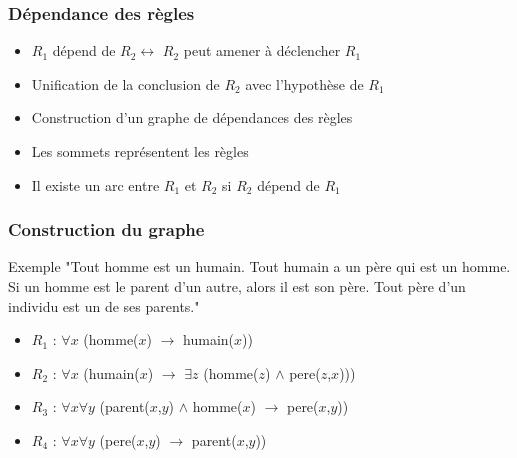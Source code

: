 
\begin{frame}
	\frametitle{Dépendance des règles}
	\begin{itemize}
		\item $R_1$ dépend de $R_2 \leftrightarrow $ $R_2$ peut amener à déclencher $R_1$
		\item Unification de la conclusion de $R_2$ avec l'hypothèse de $R_1$
		\item Construction d'un graphe de dépendances des règles
		\item Les sommets représentent les règles
		\item Il existe un arc entre $R_1$ et $R_2$ si $R_2$ dépend de $R_1$
	\end{itemize}
\end{frame}

\begin{frame}
	\frametitle{Construction du graphe}
	\begin{exampleblock}{Exemple}
		"Tout homme est un humain.
		Tout humain a un père qui est un homme.
		Si un homme est le parent d'un autre, alors il est son père.
		Tout père d'un individu est un de ses parents."

		\begin{itemize}
			\item $R_1$ : $\forall x$ (homme($x$) $\rightarrow$ humain($x$))
			\item $R_2$ : $\forall x$ (humain($x$) $\rightarrow$ $\exists z$ (homme($z$)
			$\wedge$ pere($z$,$x$)))
			\item $R_3$ : $\forall x \forall y$ (parent($x$,$y$) $\wedge$ homme($x$)
			$\rightarrow$ pere($x$,$y$))
			\item $R_4$ : $\forall x \forall y$ (pere($x$,$y$) $\rightarrow$
			parent($x$,$y$))
		\end{itemize}
	\end{exampleblock}
\end{frame}

